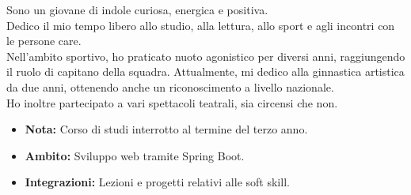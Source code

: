 \documentclass[10pt,a4paper,ragged2e,withhyper]{other/altacv}
\begin{document}


\makecvheader




\begin{paracol}{2}
Sono un giovane di indole curiosa, energica e positiva.\\
Dedico il mio tempo libero allo studio, alla lettura, allo sport e agli incontri con le persone care.\\
Nell'ambito sportivo, ho praticato nuoto agonistico per diversi anni, raggiungendo il ruolo di capitano della squadra. Attualmente, mi dedico alla ginnastica artistica da due anni, ottenendo anche un riconoscimento a livello nazionale.\\
Ho inoltre partecipato a vari spettacoli teatrali, sia circensi che non.

\medskip


\medskip

    \begin{itemize}
        \item \textbf{Nota:} Corso di studi interrotto al termine del terzo anno.
    \end{itemize}
\medskip

    \begin{itemize}
        \item \textbf{Ambito:} Sviluppo web tramite Spring Boot.
        \item \textbf{Integrazioni:} Lezioni e progetti relativi alle soft skill.
    \end{itemize}
\medskip


\end{paracol}
\end{document}
